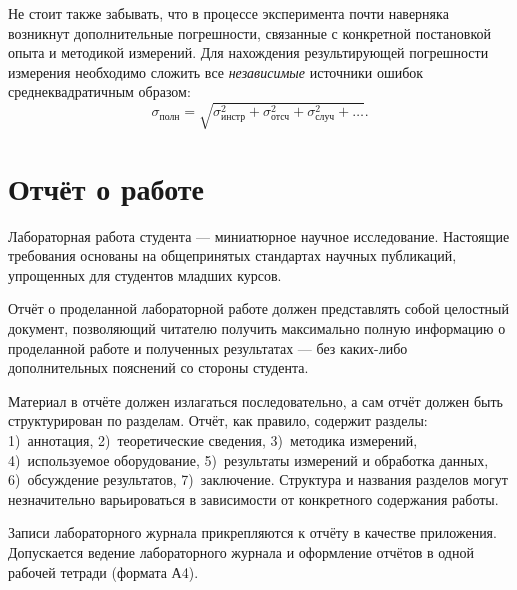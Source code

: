 Не стоит также забывать, что в процессе эксперимента почти наверняка
возникнут дополнительные погрешности, связанные с конкретной постановкой
опыта и методикой измерений. Для нахождения результирующей погрешности
измерения необходимо сложить все \emph{независимые} источники ошибок
среднеквадратичным образом:
\[\sigma_{\text{полн}}=\sqrt{\sigma_{\text{инстр}}^{2}+
\sigma_{\text{отсч}}^{2}+\sigma_{\text{случ}}^{2}+\ldots}.\]


\section{Отчёт о работе}\label{sec:report}

Лабораторная работа студента --- миниатюрное научное исследование.
Настоящие требования основаны на общепринятых стандартах научных публикаций,
упрощенных для студентов младших курсов.

Отчёт о проделанной лабораторной работе должен представлять собой
целостный документ, позволяющий читателю получить максимально полную
информацию о проделанной работе и полученных результатах ---
без каких-либо дополнительных пояснений со стороны студента.

Материал в отчёте должен излагаться последовательно, а сам отчёт должен
быть структурирован по разделам. Отчёт, как правило, содержит разделы:
1)~аннотация, 2)~теоретические сведения, 3)~методика измерений,
4)~используемое оборудование, 5)~результаты измерений и обработка данных,
6)~обсуждение результатов, 7)~заключение. Структура и названия разделов
могут незначительно варьироваться в зависимости от конкретного содержания
работы.

Записи лабораторного журнала прикрепляются к отчёту в качестве приложения.
Допускается ведение лабораторного журнала и оформление отчётов в одной
рабочей тетради (формата А4).



